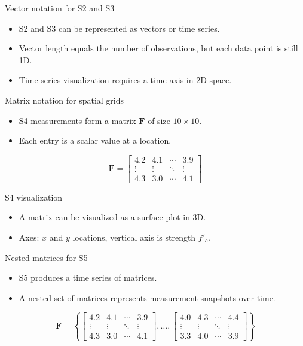 \documentclass[12pt]{beamer}
\begin{document}
\begin{frame}{Vector notation for S2 and S3}
  \begin{itemize}
    \item S2 and S3 can be represented as vectors or time series.
    \item Vector length equals the number of observations, but each data point is still 1D.
    \item Time series visualization requires a time axis in 2D space.
  \end{itemize}
\end{frame}

\begin{frame}{Matrix notation for spatial grids}
  \begin{itemize}
    \item S4 measurements form a matrix $\bm{F}$ of size $10 \times 10$.
    \item Each entry is a scalar value at a location.
  \end{itemize}
  \[
  \bm{F} =
  \begin{bmatrix}
  4.2 & 4.1 & \cdots & 3.9 \\
  \vdots & \vdots & \ddots & \vdots \\
  4.3 & 3.0 & \cdots & 4.1
  \end{bmatrix}
  \]
\end{frame}

\begin{frame}{S4 visualization}
  \begin{itemize}
    \item A matrix can be visualized as a surface plot in 3D.
    \item Axes: $x$ and $y$ locations, vertical axis is strength $f'_c$.
  \end{itemize}
  \vspace{0.5em}
\end{frame}

\begin{frame}{Nested matrices for S5}
  \begin{itemize}
    \item S5 produces a time series of matrices.
    \item A nested set of matrices represents measurement snapshots over time.
  \end{itemize}
  \[
  \bm{F} = \left\{\begin{bmatrix}
  4.2 & 4.1 & \cdots & 3.9 \\
  \vdots & \vdots & \ddots & \vdots \\
  4.3 & 3.0 & \cdots & 4.1
  \end{bmatrix}, \ldots, \begin{bmatrix}
  4.0 & 4.3 & \cdots & 4.4 \\
  \vdots & \vdots & \ddots & \vdots \\
  3.3 & 4.0 & \cdots & 3.9
  \end{bmatrix}\right\}
  \]
\end{frame}
\end{document}
